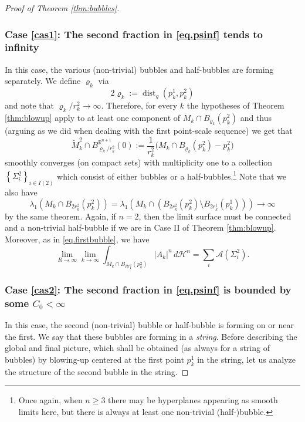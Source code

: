 \documentclass[JEP,XML,SOM,Unicode]{cedram}
\let\mathcal\mathscr
\newcounter{cas}
\DeclareMathOperator{\dist}{dist}
\theoremstyle{definition}
\newcommand{\R}{\mathbb{R}}
\newcommand{\h}{\mathscr{H}}
\begin{document}
\begin{proof}[Proof of Theorem \ref{thm:bubbles}]
\subsubsection*{\label{cas1}Case \ref{cas1}: The second fraction in \eqref{eq.psinf} tends to infinity} In this case, the various (non-trivial) bubbles and half-bubbles are forming separately. We define $\varrho_k$ via
$$2\varrho_k:= \dist_g(p^1_k,p^2_k)$$ and note that $\varrho_k/r^2_k\to \infty$. Therefore, for every $k$ the hypotheses of Theorem \ref{thm:blowup} apply to at least one component of $M_k\cap B_{\varrho_k}(p^2_k)$ and thus (arguing as we did when dealing with the first point-scale sequence) we get that
\begin{equation*}
\widetilde{M}_k^2 \cap B^{\R^{n+1}}_{\varrho_k/r^2_k}(0) := \frac{1}{r^2_k}\big(M_k\cap B_{\varrho_k}(p^2_k)- p^2_k\big)
\end{equation*}
smoothly converges (on compact sets) with multiplicity one to a collection $\left\{\Sigma^2_i\right\}_{i\in I(2)}$ which consist of either bubbles or a half-bubbles.\footnote{Once again, when $n\geq 3$ there may be hyperplanes appearing as smooth limits here, but there is always at least one non-trivial (half-)bubble.} Note that we also have
$$\lambda_1(M_k\cap B_{2r^2_k}(p^2_k))=\lambda_1(M_k\cap (B_{2r^2_k}(p^2_k)\setminus B_{2r^1_k}(p^1_k)))\to \infty$$ by the same theorem. Again, if $n=2$, then the limit surface must be connected and a non-trivial half-bubble if we are in Case II of Theorem \ref{thm:blowup}. Moreover, as in \eqref{eq.firstbubble}, we have
\begin{equation}\label{eq.secbubble1}
\lim_{R\to \infty} \lim_{k\to \infty} \int_{M_k\cap B_{Rr^2_k}(p^2_k)} |A_k|^n \, d\h^n =\sum_i \mathcal{A}(\Sigma^2_i).
\end{equation}

\subsubsection*{\label{cas2}Case \ref{cas2}: The second fraction in \eqref{eq.psinf} is bounded by some $C_0<\infty$}
In this case, the second (non-trivial) bubble or half-bubble is forming on or near the first. We say that these bubbles are forming in a \emph{string}. Before describing the global and final picture, which shall be obtained (as always for a string of bubbles) by blowing-up centered at the first point $p^1_k$ in the string, let us analyze the structure of the second bubble in the string.


\end{proof}
\end{document}
